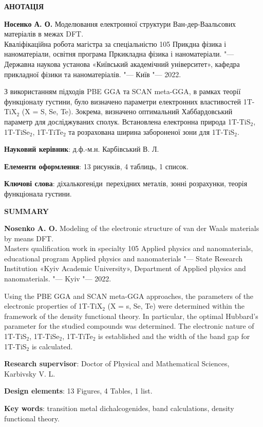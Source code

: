 \begin{center}
{\large \textbf{АНОТАЦІЯ}}
\end{center}

\textbf{Носенко А. О.} Моделювання електронної структури Ван-дер-Ваальсових матеріалів в межах DFT. \\
Кваліфікаційна робота магістра за спеціальністю 105 Прикдна фізика і наноматеріали, освітня програма Пркикладна фізика і наноматеріали. 
"--- Державна наукова установа «Київський академічний університет», кафедра прикладної фізики та наноматеріалів. "--- Київ "--- 2022.

З використанням підходів PBE GGA та SCAN meta-GGA, в рамках теорії функціоналу густини, було визначено параметри електронних властивостей 1T-TiX$_2$ (X = S, Se, Te). Зокрема, визначено оптимальний Хаббардовський параметр для досліджуваних сполук. Встановлена електронна природа 1T-TiS$_2$, 1T-TiSe$_2$, 1T-TiTe$_2$ та розрахована ширина забороненої зони для 1T-TiS$_2$.  

\textbf{Науковий керівник}: д.ф.-м.н. Карбівський В. Л.

\textbf{Елементи оформлення}: 13 рисунків, 4 таблиць, 1 список.

\textbf{Ключові слова}: діхалькогеніди перехідних металів, зонні розрахунки, теорія функціонала густини.



\bigskip

\clearpage

\thispagestyle{empty}
\begin{center}
{\large \textbf{SUMMARY}}
\end{center}

\textbf{Nosenko A. O.} Modeling of the electronic structure of van der Waals materials by means DFT. \\
Masters qualification work in specialty 105 Applied physics and nanomaterials, educational program Applied physics and nanomaterials "--- State Research Institution «Kyiv Academic University», Department of Applied physics and nanomaterials. "--- Kyiv "--- 2022.

Using the PBE GGA and SCAN meta-GGA approaches, the parameters of the electronic properties of 1T-TiX$_2$ (X = s, Se, Te) were determined within the framework of the density functional theory. In particular, the optimal Hubbard's parameter for the studied compounds was determined. The electronic nature of 1T-TiS$_2$, 1T-TiSe$_2$, 1T-TiTe$_2$ is established and the width of the band gap for 1T-TiS$_2$ is calculated.

\textbf{Research supervisor}: Doctor of Physical and Mathematical Sciences, \\ Karbivsky V. L.

\textbf{Design elements}: 13 Figures, 4 Tables, 1 list.

\textbf{Key words}: transition metal dichalcogenides, band calculations, density functional theory.



